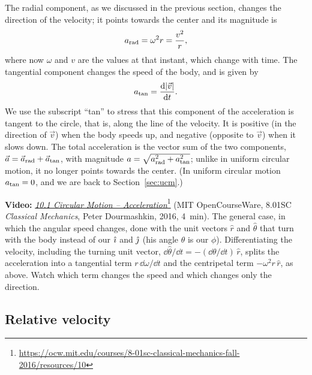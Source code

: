 \documentclass[11pt,a4paper]{article}
\begin{document}
The radial component, as we discussed in the previous section, changes the direction of the
velocity; it points towards the center and its magnitude is
\begin{equation}\label{eq:arad2}
  a_{\mathrm{rad}} = \omega^2 r = \frac{v^2}{r} ,
\end{equation}
where now $\omega$ and $v$ are the values at that instant, which change with time. The tangential
component changes the speed of the body, and is given by
\begin{equation}\label{eq:atan}
  a_{\mathrm{tan}} = \frac{\mathrm{d}|\vec{v}|}{\mathrm{d} t} .
\end{equation}
We use the subscript ``tan'' to stress that this component of the acceleration is tangent to the
circle, that is, along the line of the velocity. It is positive (in the direction of $\vec{v}$) when the body
speeds up, and negative (opposite to $\vec{v}$) when it slows down. The total acceleration is the
vector sum of the two components, $\vec{a} = \vec{a}_{\mathrm{rad}} + \vec{a}_{\mathrm{tan}}$, with magnitude
$a = \sqrt{a_{\mathrm{rad}}^2 + a_{\mathrm{tan}}^2}$; unlike in uniform circular motion, it no longer points
towards the center. (In uniform circular motion $a_{\mathrm{tan}} = 0$, and we are back to
Section~\ref{sec:ucm}.)

\begin{aside}
\textbf{Video:}
\href{https://ocw.mit.edu/courses/8-01sc-classical-mechanics-fall-2016/resources/10}{\emph{10.1
Circular Motion -- Acceleration}}\footnote{\url{https://ocw.mit.edu/courses/8-01sc-classical-mechanics-fall-2016/resources/10}}
(MIT OpenCourseWare, 8.01SC \emph{Classical Mechanics}, Peter Dourmashkin, 2016, 4~min). The
general case, in which the angular speed changes, done with the unit vectors $\hat{r}$ and
$\hat{\theta}$ that turn with the body instead of our $\hat{\imath}$ and $\hat{\jmath}$ (his angle $\theta$ is our
$\phi$). Differentiating the velocity, including the turning unit vector,
$\dd\hat{\theta}/\dd t = -(\dd\theta/\dd t)\,\hat{r}$, splits the acceleration into a tangential
term $r\,\dd\omega/\dd t$ and the centripetal term $-\omega^2 r\,\hat{r}$, as above. Watch which
term changes the speed and which changes only the direction.
\end{aside}

\subsection{Relative velocity}\label{sec:relative}
\end{document}
